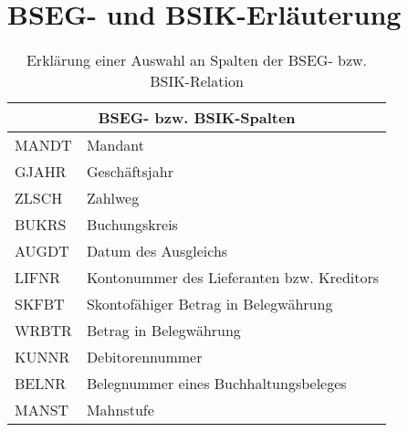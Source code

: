 \section{BSEG- und BSIK-Erläuterung}

\begin{table}[h]
	\centering
	\begin{tabular}{ |l|l| }
		\hline
		\multicolumn{2}{|c|}{BSEG- bzw. BSIK-Spalten} \\
		\hline
		MANDT & Mandant \\
		GJAHR & Geschäftsjahr \\
		ZLSCH & Zahlweg \\
		BUKRS & Buchungskreis \\
		AUGDT & Datum des Ausgleichs \\
		LIFNR & Kontonummer des Lieferanten bzw. Kreditors \\
		SKFBT & Skontofähiger Betrag in Belegwährung \\
		WRBTR & Betrag in Belegwährung \\
		KUNNR & Debitorennummer \\
		BELNR & Belegnummer eines Buchhaltungsbeleges \\
		MANST & Mahnstufe \\
		\hline
	\end{tabular}
	\caption{Erklärung einer Auswahl an Spalten der BSEG- bzw. BSIK-Relation}
	\label{tab:bsegerlaeuterung}
\end{table}